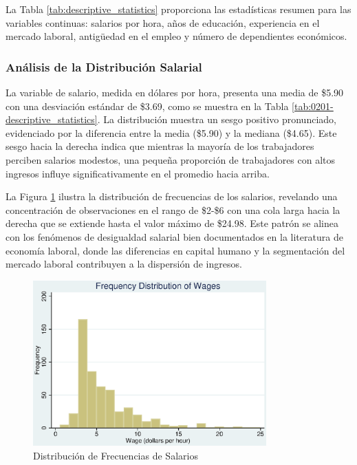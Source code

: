 \documentclass[12pt]{article}
\begin{document}
La Tabla \ref{tab:descriptive_statistics} proporciona las estadísticas resumen para las variables continuas: salarios por hora, años de educación, experiencia en el mercado laboral, antigüedad en el empleo y número de dependientes económicos.



\subsubsection*{Análisis de la Distribución Salarial}

La variable de salario, medida en dólares por hora, presenta una media de \$5.90 con una desviación estándar de \$3.69, como se muestra en la Tabla \ref{tab:0201-descriptive_statistics}. La distribución muestra un sesgo positivo pronunciado, evidenciado por la diferencia entre la media (\$5.90) y la mediana (\$4.65). Este sesgo hacia la derecha indica que mientras la mayoría de los trabajadores perciben salarios modestos, una pequeña proporción de trabajadores con altos ingresos influye significativamente en el promedio hacia arriba.

La Figura \ref{fig:hist_wage} ilustra la distribución de frecuencias de los salarios, revelando una concentración de observaciones en el rango de \$2-\$6 con una cola larga hacia la derecha que se extiende hasta el valor máximo de \$24.98. Este patrón se alinea con los fenómenos de desigualdad salarial bien documentados en la literatura de economía laboral, donde las diferencias en capital humano y la segmentación del mercado laboral contribuyen a la dispersión de ingresos.

\begin{figure}[h!]
\centering
\includegraphics[width=0.8\textwidth]{Figures/0201-hist_wage.eps}
\caption{Distribución de Frecuencias de Salarios}
\label{fig:hist_wage}
\end{figure}
\end{document}
